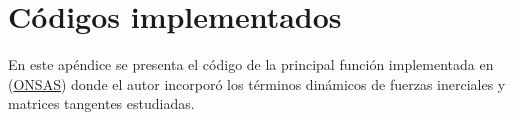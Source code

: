\chapter{Códigos implementados}\label{Ape1}

En este apéndice se presenta el código de la principal función implementada en (\href{https://github.com/ONSAS/ONSAS.m/}{ONSAS}) donde el autor incorporó los términos dinámicos de fuerzas inerciales y matrices tangentes estudiadas.

%
